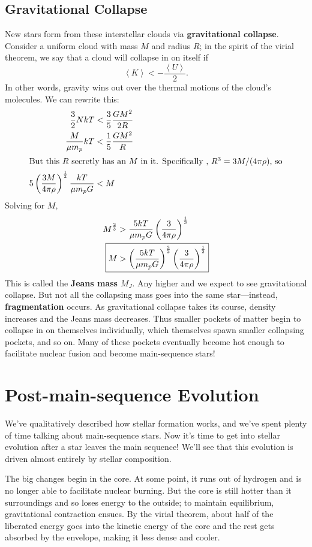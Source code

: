 \documentclass[../a062main.tex]{subfiles}
\begin{document}
\subsection*{Gravitational Collapse}
New stars form from these interstellar clouds via \textbf{gravitational collapse}.
Consider a uniform cloud with mass $M$ and radius $R$; in the spirit of the virial theorem, we say that a cloud will collapse in on itself if
\[ \left< K \right> < -\frac{\left< U \right>}{2}. \]
In other words, gravity wins out over the thermal motions of the cloud's molecules.
We can rewrite this:
\begin{align*}
    \frac{3}{2} NkT &< \frac{3}{5} \frac{GM^2}{2R} \\
    \frac{M}{\mu m_p} kT &< \frac{1}{5} \frac{GM^2}{R} \\
    \intertext{But this $R$ secretly has an $M$ in it. Specifically , $R^3 = 3M / (4\pi \rho)$, so}
    5 \left( \frac{3M}{4\pi \rho} \right)^{\frac{1}{3}} \frac{kT}{\mu m_p G} &< M
\end{align*}
Solving for $M$,
\begin{align*}
    M^{\frac{2}{3}} &> \frac{5kT}{\mu m_p G} \left( \frac{3}{4\pi \rho} \right)^{\frac{1}{3}} \\
    \Aboxed{M &> \left( \frac{5kT}{\mu m_p G} \right)^{\frac{3}{2}} \left( \frac{3}{4\pi \rho} \right)^{\frac{1}{2}}}
\end{align*}
This is called the \textbf{Jeans mass} $M_J$.
Any higher and we expect to see gravitational collapse.
But not all the collapsing mass goes into the same star---instead, \textbf{fragmentation} occurs.
As gravitational collapse takes its course, density increases and the Jeans mass decreases.
Thus smaller pockets of matter begin to collapse in on themselves individually, which themselves spawn smaller collapsing pockets, and so on.
Many of these pockets eventually become hot enough to facilitate nuclear fusion and become main-sequence stars!

\section{Post-main-sequence Evolution}
We've qualitatively described how stellar formation works, and we've spent plenty of time talking about main-sequence stars.
Now it's time to get into stellar evolution after a star leaves the main sequence!
We'll see that this evolution is driven almost entirely by stellar composition.

The big changes begin in the core.
At some point, it runs out of hydrogen and is no longer able to facilitate nuclear burning.
But the core is still hotter than it surroundings and so loses energy to the outside; to maintain equilibrium, gravitational contraction ensues.
By the virial theorem, about half of the liberated energy goes into the kinetic energy of the core and the rest gets absorbed by the envelope, making it less dense and cooler.
\end{document}

